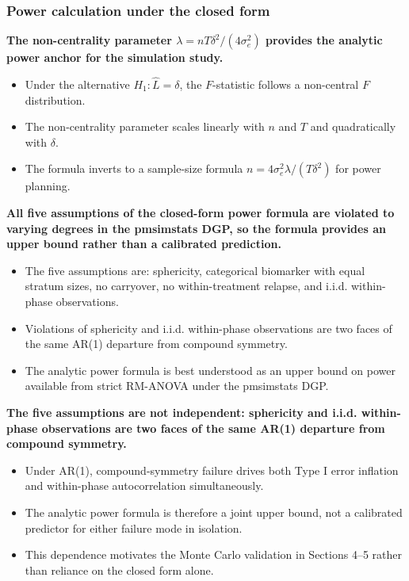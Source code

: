 \documentclass[
  11pt,
]{article}
\begin{document}
\subsubsection{Power calculation under the closed form}\label{power-calculation-under-the-closed-form}

\textbf{The non-centrality parameter $\lambda = nT\delta^2 / (4\sigma_e^2)$ provides the analytic power anchor for the simulation study.}

\begin{itemize}\setlength{\itemsep}{2pt}\setlength{\parskip}{0pt}
\item Under the alternative $H_1: \hat{L} = \delta$, the $F$-statistic follows a non-central $F$ distribution.
\item The non-centrality parameter scales linearly with $n$ and $T$ and quadratically with $\delta$.
\item The formula inverts to a sample-size formula $n = 4\sigma_e^2\lambda / (T\delta^2)$ for power planning.
\end{itemize}

\textbf{All five assumptions of the closed-form power formula are violated to varying degrees in the pmsimstats DGP, so the formula provides an upper bound rather than a calibrated prediction.}

\begin{itemize}\setlength{\itemsep}{2pt}\setlength{\parskip}{0pt}
\item The five assumptions are: sphericity, categorical biomarker with equal stratum sizes, no carryover, no within-treatment relapse, and i.i.d. within-phase observations.
\item Violations of sphericity and i.i.d. within-phase observations are two faces of the same AR(1) departure from compound symmetry.
\item The analytic power formula is best understood as an upper bound on power available from strict RM-ANOVA under the pmsimstats DGP.
\end{itemize}

\textbf{The five assumptions are not independent: sphericity and i.i.d. within-phase observations are two faces of the same AR(1) departure from compound symmetry.}

\begin{itemize}\setlength{\itemsep}{2pt}\setlength{\parskip}{0pt}
\item Under AR(1), compound-symmetry failure drives both Type I error inflation and within-phase autocorrelation simultaneously.
\item The analytic power formula is therefore a joint upper bound, not a calibrated predictor for either failure mode in isolation.
\item This dependence motivates the Monte Carlo validation in Sections 4--5 rather than reliance on the closed form alone.
\end{itemize}
\end{document}
